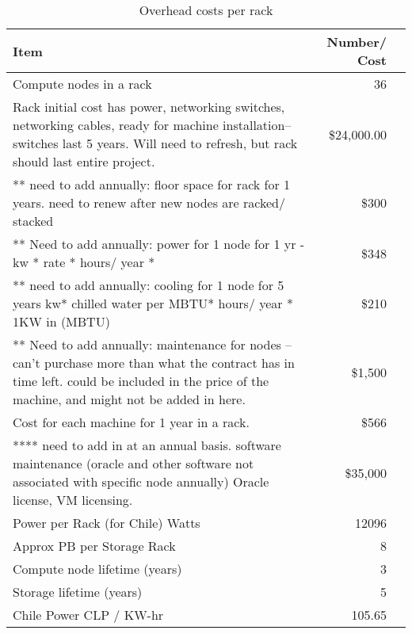 \tiny \begin{longtable} { |p{}  |r  |r |} 
\caption{Overhead costs per rack \label{tab:overheads}}\\ 
\hline 
\textbf{Item}&\textbf{Number/ Cost} \\ \hline
{Compute nodes in a rack }&{36} \\ \hline
{Rack initial cost has power, networking switches, networking cables, ready for machine installation-- switches last 5 years.  Will need to refresh, but rack should last entire project.  }&{\$24,000.00} \\ \hline
{ ** need to add annually: floor space for rack for 1 years.   need to renew after new nodes are racked/ stacked }&{\$300} \\ \hline
{** Need to add annually: power for 1 node for 1 yr - kw * rate * hours/ year * }&{\$348} \\ \hline
{** need to add annually: cooling for 1 node for 5 years  kw* chilled water per MBTU* hours/ year *  1KW in (MBTU) }&{\$210} \\ \hline
{** Need to add annually: maintenance for nodes -- can't purchase more than what the contract has in time left.  could be included in the price of the machine, and might not be added in here.  }&{\$1,500} \\ \hline
{Cost for each machine for 1 year in a rack.   }&{\$566} \\ \hline
{**** need to add in at an annual basis.  software maintenance (oracle and other software not associated with specific node annually)  Oracle license, VM licensing.  }&{\$35,000} \\ \hline
{Power per Rack (for Chile) Watts}&{12096} \\ \hline
{Approx PB per Storage Rack }&{8} \\ \hline
{Compute node lifetime (years)}&{3} \\ \hline
{Storage lifetime (years)}&{5} \\ \hline
{Chile Power CLP /  KW-hr
}&{105.65} \\ \hline
\end{longtable} \normalsize
